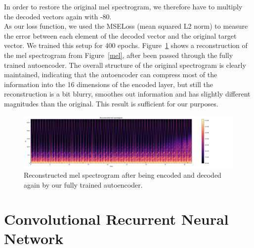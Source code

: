     In order to restore the original mel spectrogram, we therefore have to multiply the decoded vectors again with -80.\\
    As our loss function, we used the MSELoss (mean squared L2 norm) to measure the error between each element of the decoded vector and the original target vector. 
    We trained this setup for 400 epochs.
    Figure~\ref{reconstructed} shows a reconstruction of the mel spectrogram from Figure~\ref{mel}, after been passed through the fully trained autoencoder.
    The overall structure of the original spectrogram is clearly maintained, indicating that the autoencoder can compress most of the information into the 16 dimensions of the encoded layer, but still the reconstruction is a bit blurry, smoothes out information and has slightly different magnitudes than the original.
    This result is sufficient for our purposes.

    \begin{figure}
        \centering
        \includegraphics[width=\textwidth, trim=10 0 220 0, clip]{images/recon_spec}
        \caption{Reconstructed mel spectrogram after being encoded and decoded again by our fully trained autoencoder.}
        \label{reconstructed}
    \end{figure}
    
\section{Convolutional Recurrent Neural Network}

